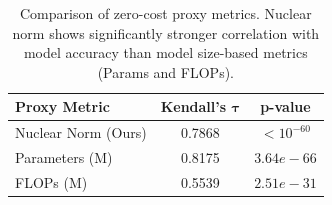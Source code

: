 
\begin{table}[t]
\centering
\caption{Comparison of zero-cost proxy metrics. Nuclear norm shows significantly stronger correlation with model accuracy than model size-based metrics (Params and FLOPs).}
\label{tab:proxy_kendall_tau}
\begin{tabular}{lcc}
\toprule
\textbf{Proxy Metric} & \textbf{Kendall's } $\boldsymbol{\tau}$ & \textbf{p-value} \\
\midrule
Nuclear Norm (Ours) & 0.7868 & $<10^{-60}$ \\
Parameters (M)      & 0.8175 & $3.64e-66$ \\
FLOPs (M)          & 0.5539 & $2.51e-31$ \\
\bottomrule
\end{tabular}
\end{table}
